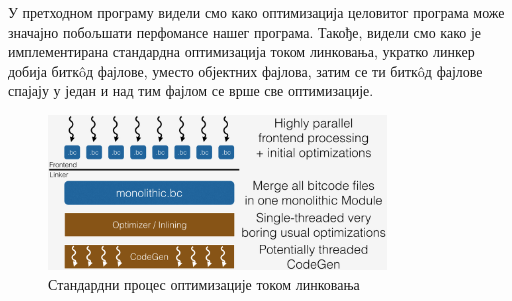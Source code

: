 \documentclass[12pt,oneside]{memoir}
\begin{document}
 У претходном програму видели смо како оптимизација целовитог програма може значајно
 побољшати перфомансе нашег програма.
 Такође, видели смо како је имплементирана стандардна оптимизација током линковања,
 укратко линкер добија битк\^{o}д фајлове, уместо објектних фајлова, затим се ти
 битк\^{o}д фајлове спајају у један и над тим фајлом се врше све оптимизације.
 
\begin{figure}[!ht]
  \centering
  \includegraphics[width=0.8\textwidth]{LTO_normal.png}
  \caption{Стандардни процес оптимизације током линковања}
  \label{fig:grafikon}
\end{figure}
\end{document}
